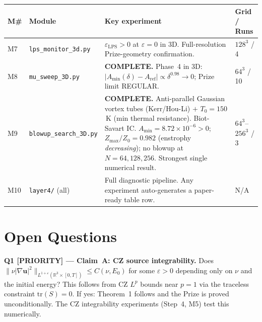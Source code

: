 \documentclass[11pt, a4paper]{article}
\theoremstyle{definition}
\theoremstyle{remark}
\newenvironment{openquestion}{%
  \begin{tcolorbox}[colback=tfgold!8, colframe=tfgold!70!black,
    title=\textbf{Open Question}, fonttitle=\small\bfseries,
    breakable, left=4pt, right=4pt, top=4pt, bottom=4pt]
}{%
  \end{tcolorbox}
}
\newcommand{\R}{\mathbb{R}}
\newcommand{\eps}{\varepsilon}
\newcommand{\epslps}{\eps_{\mathrm{LPS}}}
\begin{document}
\begin{center}
\begin{longtable}{p{1.0cm}p{4.0cm}p{5.0cm}p{2.5cm}}
\toprule
\textbf{M\#} & \textbf{Module} & \textbf{Key experiment} & \textbf{Grid / Runs} \\
\midrule
\endhead
\bottomrule
\endfoot

M7 &
\texttt{lps\_monitor\_3d.py} &
$\epslps > 0$ at $\eps = 0$ in 3D. Full-resolution Prize-geometry confirmation. &
$128^3$ / 4 \\[4pt]

M8 &
\texttt{mu\_sweep\_3D.py} &
\textcolor{passgreen}{\textbf{COMPLETE.}} Phase~4 in 3D: $|A_{\min}(\delta) - A_{\mathrm{ref}}| \propto \delta^{0.98} \to 0$; Prize limit REGULAR. &
$64^3$ / 10 \\[4pt]

M9 &
\texttt{blowup\_search\_3D.py} &
\textcolor{passgreen}{\textbf{COMPLETE.}} Anti-parallel Gaussian vortex tubes (Kerr/Hou-Li) $+$ $T_0=150$\,K (min thermal resistance). Biot-Savart IC. $A_{\min}=8.72\times10^{-6}>0$; $Z_{\max}/Z_0=0.982$ (enstrophy \emph{decreasing}); no blowup at $N=64,128,256$. Strongest single numerical result. &
$64^3$--$256^3$ / 3 \\[4pt]

M10 &
\texttt{layer4/} (all) &
Full diagnostic pipeline. Any experiment auto-generates a paper-ready table row. &
N/A \\

\end{longtable}
\end{center}

\section{Open Questions}

\begin{openquestion}
\textbf{Q1 [PRIORITY] --- Claim~A: CZ source integrability.}
Does $\|\nu|\nabla\mathbf{u}|^2\|_{L^{1+\eps}(\R^3\times[0,T])} \leq C(\nu, E_0)$
for some $\eps > 0$ depending only on $\nu$ and the initial energy?
This follows from CZ $L^p$ bounds near $p=1$ via the traceless constraint
$\mathrm{tr}(S) = 0$. If yes: Theorem~1 follows and the Prize is proved unconditionally.
The CZ integrability experiments (Step~4, M5) test this numerically.
\end{openquestion}
\end{document}
